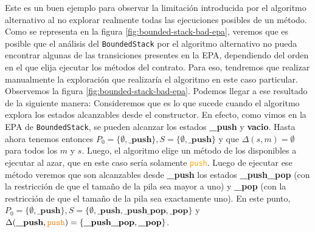 Este es un buen ejemplo para observar la limitación introducida por el algoritmo alternativo al no explorar realmente todas las ejecuciones posibles de un método.
Como se representa en la figura \ref{fig:bounded-stack-bad-epa}, veremos que es posible que el análisis del \texttt{BoundedStack} por el algoritmo alternativo no pueda encontrar algunas de las transiciones presentes en la EPA, dependiendo del orden en el que elija ejecutar los métodos del contrato.
Para eso, tendremos que realizar manualmente la exploración que realizaría el algoritmo en este caso particular.
Observemos la figura \ref{fig:bounded-stack-bad-epa}.
Podemos llegar a ese resultado de la siguiente manera:
Consideremos que es lo que sucede cuando el algoritmo explora los estados alcanzables desde el constructor.
En efecto, como vimos en la EPA de \texttt{BoundedStack}, se pueden alcanzar los estados \textbf{\_push} y \textbf{vacio}.
Hasta ahora tenemos entonces $P_0 = \{\emptyset, \textbf{\_push}\}, S = \{\emptyset, \textbf{\_push}\}$ y que  $\Delta(s,m) = \emptyset$ para todos los $m$ y $s$.
Luego, el algoritmo elige un método de los disponibles a ejecutar al azar, que en este caso sería solamente \textcolor{orange}{\texttt{push}}.
Luego de ejecutar ese método veremos que son alcanzables desde \textbf{\_push} los estados \textbf{\_push\_pop} (con la restricción de que el tamaño de la pila sea mayor a uno) y \textbf{\_pop} (con la restricción de que el tamaño de la pila sea exactamente uno).
En este punto, $P_0 = \{\emptyset, \textbf{\_push}\}, S = \{\emptyset, \textbf{\_push}, \textbf{\_push\_pop}, \textbf{\_pop}\}$ y  $\Delta(\textbf{\_push},\textcolor{orange}{\texttt{push}}) = \{\textbf{\_push\_pop}, \textbf{\_pop}\}$.

